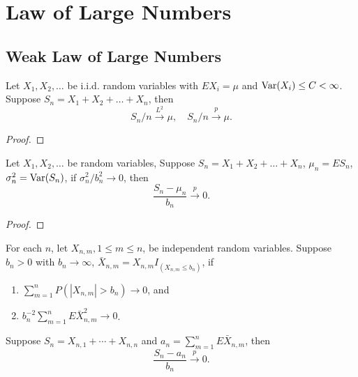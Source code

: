 \chapter{Law of Large Numbers}

\section{Weak Law of Large Numbers}

\begin{theorem}
	Let $X_1,X_2,\ldots$ be i.i.d. random variables with $EX_i=\mu$ and $\mathrm{Var}(X_i)\leq C<\infty$. Suppose $S_n=X_1+X_2+\ldots+X_n$, then
	\begin{equation}
		S_n/n\stackrel{L^2}{\rightarrow}\mu,\quad S_n/n\stackrel{p}{\rightarrow}\mu.
	\end{equation}
\end{theorem}

\begin{proof}

\end{proof}

\begin{theorem}
	Let $X_1,X_2,\ldots$ be random variables, Suppose $S_n=X_1+X_2+\ldots+X_n$, $\mu_n=ES_n$, $\sigma_n^2=\mathrm{Var}(S_n)$, if $\sigma_n^2/b_n^2\rightarrow 0$, then
	\begin{equation}
		\frac{S_n-\mu_n}{b_n}\stackrel{p}{\rightarrow}0.
	\end{equation}
\end{theorem}

\begin{proof}

\end{proof}

\begin{theorem}
	For each $n$, let $X_{n,m},1\leq m\leq n$, be independent random variables. Suppose $b_n>0$ with $b_n\rightarrow\infty$, $\bar{X}_{n,m}=X_{n,m}I_{\left(X_{n,m}\leq b_n\right)}$, if
	\begin{enumerate}
		\item $\sum_{m=1}^{n}P\left(\left|X_{n,m}\right|>b_{n}\right)\rightarrow 0$, and
		\item $b_{n}^{-2}\sum_{m=1}^{n}E\bar{X}_{n,m}^{2}\rightarrow 0$.
	\end{enumerate}
	Suppose $S_{n}=X_{n, 1}+\cdots+X_{n,n}$ and $a_{n}=\sum_{m=1}^{n}E\bar{X}_{n,m}$, then
	\begin{equation}
		\frac{S_n-a_n}{b_n}\stackrel{p}{\rightarrow}0.
	\end{equation}
\end{theorem}

